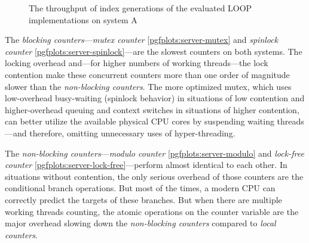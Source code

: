 \begin{@empty}
\begin{figure}[ht!]
{
        }
        \caption{The throughput of index generations of the evaluated LOOP implementations on system A}
        \label{fig:loop_server_performance}
    \end{figure}

    The \emph{blocking counters}---\emph{mutex counter} \ref{pgfplots:server-mutex} and \emph{spinlock counter} \ref{pgfplots:server-spinlock}---are the slowest counters on both systems. The locking overhead and---for higher numbers of working threads---the lock contention make these concurrent counters more than one order of magnitude slower than the \emph{non-blocking counters}. The more optimized mutex, which uses low-overhead busy-waiting (spinlock behavior) in situations of low contention and higher-overhead queuing and context switches in situations of higher contention, can better utilize the available physical CPU cores by suspending waiting threads---and therefore, omitting unnecessary uses of hyper-threading.

    The \emph{non-blocking counters}---\emph{modulo counter} \ref{pgfplots:server-modulo} and \emph{lock-free counter} \ref{pgfplots:server-lock-free}---perform almost identical to each other. In situations without contention, the only serious overhead of those counters are the conditional branch operations. But most of the times, a modern CPU can correctly predict the targets of these branches. But when there are multiple working threads counting, the atomic operations on the counter variable are the major overhead slowing down the \emph{non-blocking counters} compared to \emph{local counters}.


\end{@empty}
